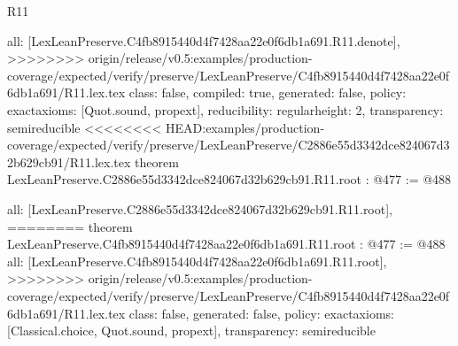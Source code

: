 \begin{lexlean}{R11}
\begin{coremodule}
{{{{{  all: [LexLeanPreserve.C4fb8915440d4f7428aa22e0f6db1a691.R11.denote],
>>>>>>>> origin/release/v0.5:examples/production-coverage/expected/verify/preserve/LexLeanPreserve/C4fb8915440d4f7428aa22e0f6db1a691/R11.lex.tex
  class: false,
  compiled: true,
  generated: false,
  policy: exact{axioms: [Quot.sound, propext]},
  reducibility: regular{height: 2},
  transparency: semireducible
}
<<<<<<<< HEAD:examples/production-coverage/expected/verify/preserve/LexLeanPreserve/C2886e55d3342dce824067d32b629cb91/R11.lex.tex
theorem LexLeanPreserve.C2886e55d3342dce824067d32b629cb91.R11.root : @477 := @488 {
  all: [LexLeanPreserve.C2886e55d3342dce824067d32b629cb91.R11.root],
========
theorem LexLeanPreserve.C4fb8915440d4f7428aa22e0f6db1a691.R11.root : @477 := @488 {
  all: [LexLeanPreserve.C4fb8915440d4f7428aa22e0f6db1a691.R11.root],
>>>>>>>> origin/release/v0.5:examples/production-coverage/expected/verify/preserve/LexLeanPreserve/C4fb8915440d4f7428aa22e0f6db1a691/R11.lex.tex
  class: false,
  generated: false,
  policy: exact{axioms: [Classical.choice, Quot.sound, propext]},
  transparency: semireducible
}

}}}}}
\end{coremodule}
\end{lexlean}
